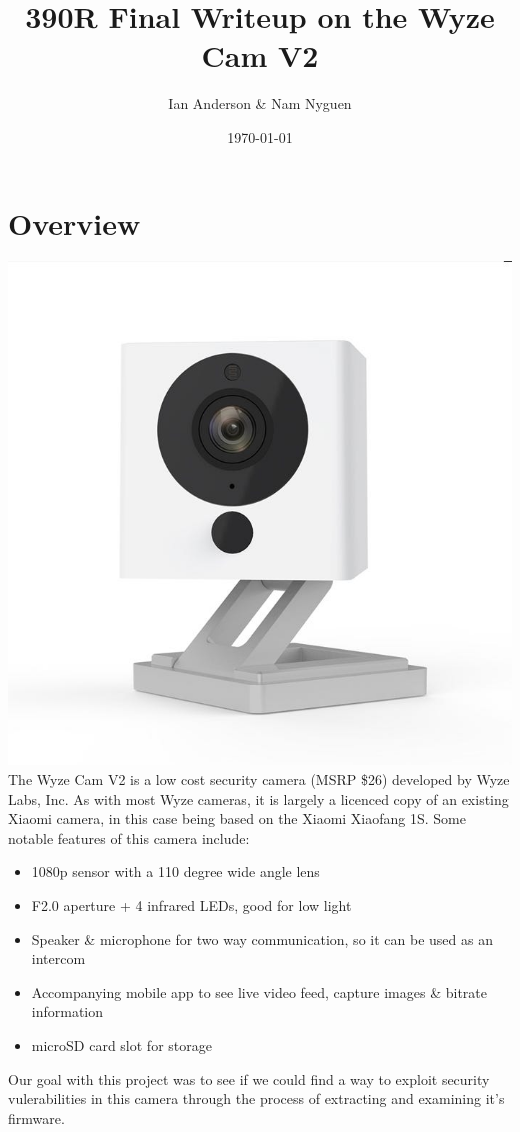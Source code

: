 \documentclass[a4paper, 11pt]{article}
\title{390R Final Writeup on the Wyze Cam V2}
\author{Ian Anderson \& Nam Nyguen}
\date{\today}
\begin{document}
\maketitle

\section{Overview}
\includegraphics[scale=0.5]{wyze}\newline
The Wyze Cam V2 is a low cost security camera (MSRP \$26) developed by Wyze Labs, Inc. As with most Wyze cameras, it is largely a licenced copy of an existing Xiaomi camera, in this case being based on the Xiaomi Xiaofang 1S.\newline\newline
Some notable features of this camera include:
\begin{itemize}
    \item 1080p sensor with a 110 degree wide angle lens
    \item F2.0 aperture + 4 infrared LEDs, good for low light
    \item Speaker \& microphone for two way communication, so it can be used as an intercom
    \item Accompanying mobile app to see live video feed, capture images \& bitrate information
    \item microSD card slot for storage 
  \end{itemize}
  Our goal with this project was to see if we could find a way to exploit security vulerabilities in this camera through the process of extracting and examining it's firmware.
\end{document}
